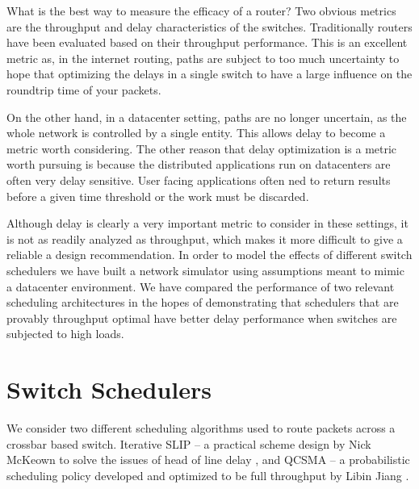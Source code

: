 \documentclass[11pt]{article}%
\begin{document}
What is the best way to measure the efficacy of a router?  Two obvious metrics are the throughput and delay characteristics of the switches.  Traditionally routers have been evaluated based on their throughput performance.  This is an excellent metric as, in the internet routing, paths are subject to too much uncertainty to hope that optimizing the delays in a single switch to have a large influence on the roundtrip time of your packets.

On the other hand, in a datacenter setting, paths are no longer uncertain, as the whole network is controlled by a single entity.  This allows delay to become a metric worth considering.  The other reason that delay optimization is a metric worth pursuing is because the distributed applications run on datacenters are often very delay sensitive.  User facing applications often ned to return results before a given time threshold or the work must be discarded.%

Although delay is clearly a very important metric to consider in these settings, it is not as readily analyzed as throughput, which makes it more difficult to give a reliable a design recommendation.  In order to model the effects of different switch schedulers we have built a network simulator using assumptions meant to mimic a datacenter environment.  We have compared the performance of two relevant scheduling architectures in the hopes of demonstrating that schedulers that are provably throughput optimal have better delay performance when switches are subjected to high loads.

\section{Switch Schedulers}
We consider two different scheduling algorithms used to route packets across a crossbar based switch.  Iterative SLIP -- a practical scheme design by Nick McKeown to solve the issues of head of line delay \cite{McKeown}, and QCSMA -- a probabilistic scheduling policy developed and optimized to be full throughput by Libin Jiang \cite{Libin}.
\end{document}
